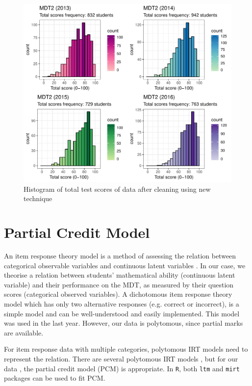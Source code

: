 \documentclass[a4paper]{report}
\begin{document}
\begin{figure}[H]
  \centering
  \includegraphics[width=\linewidth]{fig/EDA_hist_13to16_clean.pdf}
  \caption{\label{fig:EDA_hist_13to16_clean}Histogram of total test scores of data after cleaning using new technique}
\end{figure}


\chapter{Partial Credit Model}

An item response theory model is a method of assessing the relation between categorical observable variables and continuous latent variables \cite{lvm}. In our case, we theorise a relation between students' mathematical ability (continuous latent variable) and their performance on the MDT, as measured by their question scores (categorical observed variables). A dichotomous item response theory model which has only two alternative responses (e.g. correct or incorrect), is a simple model and can be well-understood and easily implemented. This model was used in the last year. However, our data is polytomous, since partial marks are available. 

For item response data with multiple categories, polytomous IRT models need to represent the relation. There are several polytomous IRT models \cite{IRT}, but for our data , the partial credit model (PCM) is appropriate. In \texttt{R}, both \texttt{ltm} and \texttt{mirt} packages can be used to fit PCM. 
\end{document}
